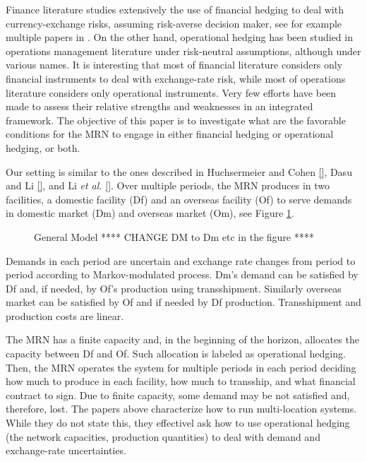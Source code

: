 \documentclass[mnsc,nonblindrev,copyedit]{informs2_wz} %
\begin{document}
Finance literature studies extensively the use of financial hedging to deal with currency-exchange risks, assuming risk-averse decision maker, see for example multiple papers in \cite{Fhedge1, Fhedge2}.
On the other hand, operational hedging has been studied in operations management literature under risk-neutral assumptions, although under various names.  
It is interesting that most of financial literature considers only financial instruments to deal with exchange-rate risk, while most of operations literature considers only operational instruments.  Very few efforts have been made to assess their relative strengths and weaknesses in an integrated framework.  The objective of this paper is to investigate what are the favorable conditions for the MRN to engage in either financial hedging or operational hedging, or both.

Our setting is similar to the ones described in Huchsermeier and Cohen \ref{}, Dasu and Li \ref{}, and Li {\em et al.} \ref{}.
Over multiple periods, the MRN produces in two facilities, a domestic facility (Df) and an overseas facility (Of) to serve demands in domestic market (Dm) and overseas market (Om), see Figure \ref{figure:frameGeneral}.  
\begin{figure}[ht]
    \begin{center}
    \end{center}
    \caption{General Model **** CHANGE DM to Dm etc in the figure ****}\label{figure:frameGeneral}
\end{figure}
Demands in each period are uncertain and exchange rate changes from period to period according to Markov-modulated process. Dm's demand can be satisfied by Df and, if needed, by Of's production using transshipment.  Similarly overseas market can be satisfied by Of and if needed by Df production.  Transshipment and production costs are linear.  

The MRN has a finite capacity and, in the beginning of the horizon, allocates the capacity between Df and Of.  Such allocation is labeled as operational hedging.  Then, the MRN operates the system for multiple periods  in each period deciding how much to produce in each facility, how much to transship, and what financial contract to sign. Due to finite capacity, some demand may be not satisfied and, therefore, lost. The papers above characterize how to run multi-location systems.  While they do not state this, they effectivel ask how to use operational hedging (the network capacities, production quantities) to deal with demand and exchange-rate uncertainties.
\end{document}
